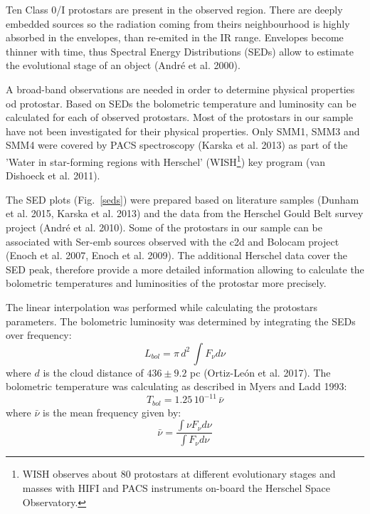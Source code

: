 \documentclass{aa}
\begin{document}
Ten Class 0/I protostars are present in the observed region. There are deeply embedded sources so the radiation coming from theirs neighbourhood is highly absorbed in the envelopes, than re-emited in the IR range. Envelopes become thinner with time, thus Spectral Energy Distributions (SEDs) allow to estimate the evolutional stage of an object (André et al. 2000). 

A broad-band observations are needed in order to determine physical properties od protostar. Based on SEDs the bolometric temperature and luminosity can be calculated for each of observed protostars. Most of the protostars in our sample have not been investigated for their physical properties. Only SMM1, SMM3 and SMM4 were covered by PACS spectroscopy (Karska et al. 2013) as part of the 'Water in star-forming regions with Herschel' (WISH\footnote{WISH observes about 80 protostars at different evolutionary stages and masses with HIFI and PACS instruments on-board the Herschel Space Observatory.}) key program (van Dishoeck et al. 2011). 

The SED plots (Fig.~\ref{seds}) were prepared based on literature samples (Dunham et al. 2015, Karska et al. 2013) and the data from the Herschel Gould Belt survey project (André et al. 2010). Some of the protostars in our sample can be associated with Ser-emb sources observed with the c2d and Bolocam project (Enoch et al. 2007, Enoch et al. 2009). The additional Herschel data cover the SED peak, therefore provide a
more detailed information allowing to calculate the bolometric temperatures and luminosities of the protostar more precisely.

The linear interpolation was performed while calculating the protostars parameters. The bolometric luminosity was determined by integrating the SEDs over frequency:
\begin{equation} \label{eq1}
L_{bol} = \pi \, d^2 \, \int F_\nu d\nu
\end{equation}
where $d$ is the cloud distance of $436 \pm 9.2$ pc (Ortiz-León et al. 2017).
The bolometric temperature was calculating as described in Myers and Ladd 1993:
\begin{equation} \label{eq2}
T_{bol} = 1.25 \, 10^{-11} \, \bar{\nu}
\end{equation}
where $\bar{\nu}$ is the mean frequency given by:
\begin{equation} \label{eq3}
\bar{\nu} = \frac{\int \nu F_\nu d\nu}{ \int F_\nu d\nu}
\end{equation}
\end{document}
